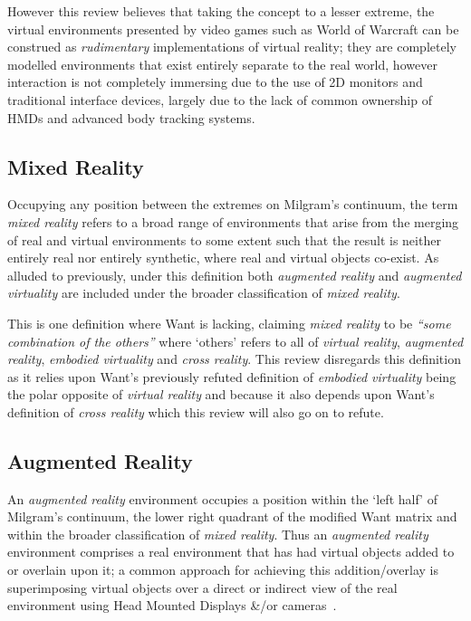 However this review believes that taking the concept to a lesser extreme, the virtual environments presented by video games such as World of Warcraft can be construed as \textit{rudimentary} implementations of virtual reality; they are completely modelled environments that exist entirely separate to the real world, however interaction is not completely immersing due to the use of 2D monitors and traditional interface devices, largely due to the lack of common ownership of HMDs and advanced body tracking systems.

\subsection{Mixed Reality}
Occupying any position between the extremes on Milgram's continuum, the term \textit{mixed reality} refers to a broad range of environments that arise from the merging of real and virtual environments to some extent such that the result is neither entirely real nor entirely synthetic, where real and virtual objects co-exist. As alluded to previously, under this definition both \textit{augmented reality} and \textit{augmented virtuality} are included under the broader classification of \textit{mixed reality}.

This is one definition where Want is lacking, claiming \textit{mixed reality} to be \textit{``some combination of the others''} where `others' refers to all of \textit{virtual reality}, \textit{augmented reality}, \textit{embodied virtuality} and \textit{cross reality}. This review disregards this definition as it relies upon Want's previously refuted definition of \textit{embodied virtuality} being the polar opposite of \textit{virtual reality} and because it also depends upon Want's definition of \textit{cross reality} which this review will also go on to refute.

\subsection{Augmented Reality}
An \textit{augmented reality} environment occupies a position within the `left half' of Milgram's continuum, the lower right quadrant of the modified Want matrix and within the broader classification of \textit{mixed reality}. Thus an \textit{augmented reality} environment comprises a real environment that has had virtual objects added to or overlain upon it; a common approach for achieving this addition/overlay is superimposing virtual objects over a direct or indirect view of the real environment using Head Mounted Displays \&/or cameras~\cite{Krevelen2010}.

